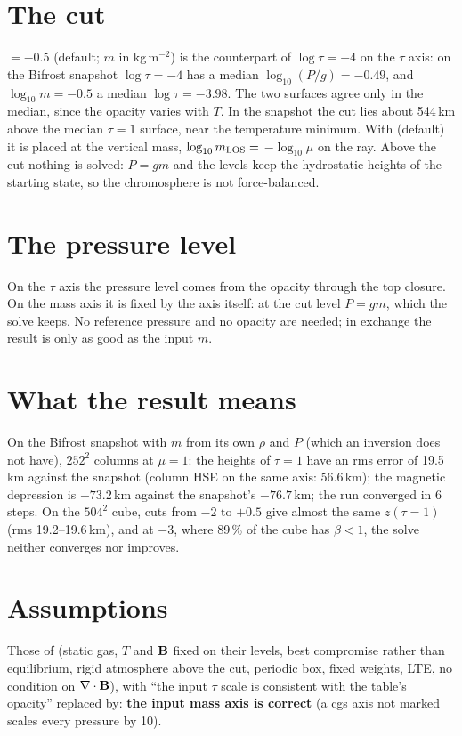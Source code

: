 \section{The cut}
 $=-0.5$ (default; $m$ in kg\,m$^{-2}$) is the counterpart of $\log\tau=-4$ on the $\tau$ axis: on the Bifrost
snapshot $\log\tau=-4$ has a median $\log_{10}(P/g)=-0.49$, and $\log_{10}m=-0.5$ a median $\log\tau=-3.98$. The two surfaces agree
only in the median, since the opacity varies with $T$. In the snapshot the cut lies about 544\,km above the median $\tau=1$ surface,
near the temperature minimum. With  (default) it is placed at the vertical mass,
$\log_{10}m_{\rm LOS}=$  $-\log_{10}\mu$ on the ray. Above the cut nothing is solved: $P=gm$ and the levels keep the
hydrostatic heights of the starting state, so the chromosphere is not force-balanced.

\section{The pressure level}
On the $\tau$ axis the pressure level comes from the opacity through the top closure. On the mass axis it is fixed by the axis
itself: at the cut level $P=gm$, which the solve keeps. No reference pressure and no opacity are needed; in exchange the result is
only as good as the input $m$.

\section{What the result means}
On the Bifrost snapshot with $m$ from its own $\rho$ and $P$ (which an inversion does not have), $252^2$ columns at $\mu=1$: the heights
of $\tau=1$ have an rms error of 19.5\,km against the snapshot (column HSE on the same axis: 56.6\,km); the magnetic depression is
$-73.2$\,km against the snapshot's $-76.7$\,km; the run converged in 6 steps. On the $504^2$ cube, cuts from $-2$ to $+0.5$ give almost
the same $z(\tau=1)$ (rms 19.2--19.6\,km), and at $-3$, where 89\,\% of the cube has $\beta<1$, the solve neither converges nor improves.

\section{Assumptions}
Those of  (static gas, $T$ and $\mathbf B$ fixed on their levels, best compromise rather than equilibrium, rigid
atmosphere above the cut, periodic box, fixed weights, LTE, no condition on $\nabla\cdot\mathbf B$), with ``the input $\tau$ scale is
consistent with the table's opacity'' replaced by: \textbf{the input mass axis is correct} (a cgs axis not marked
 scales every pressure by 10).


